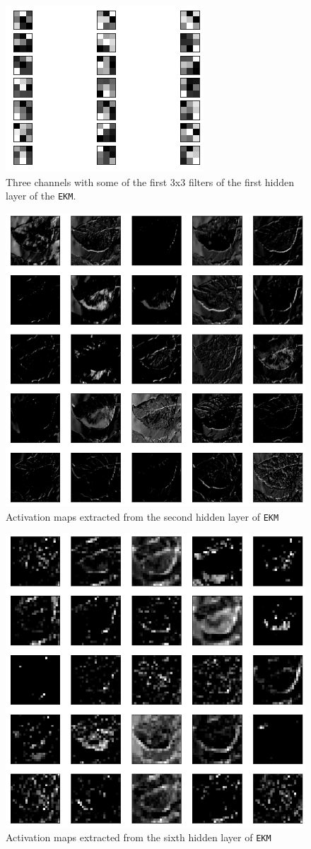 \documentclass[aps,twocolumn,secnumarabic,nobalancelastpage,amsmath,amssymb,
nofootinbib]{revtex4}
\begin{document}
\begin{figure}[h!]
	\centering
	\includegraphics[width=0.6\linewidth]{Images/FiltersEKM}
	\caption{Three channels with some of the first 3x3 filters of the first hidden layer of the \texttt{EKM}.}
	\label{fig:filtersekm}
\end{figure}
\begin{figure}[h!]
	\centering
	\includegraphics[width=0.6\linewidth]{Images/FeatureMaps9}
	
	\caption{Activation maps extracted from the second hidden layer of \texttt{EKM}}
	\label{fig:fm9}
\end{figure}
\begin{figure}[h!]
	\centering
	\includegraphics[width=0.6\linewidth]{Images/FeatureMaps6}
	
	\caption{Activation maps extracted from the sixth hidden layer of \texttt{EKM}}
	\label{fig:fm6}
\end{figure}
\end{document}
